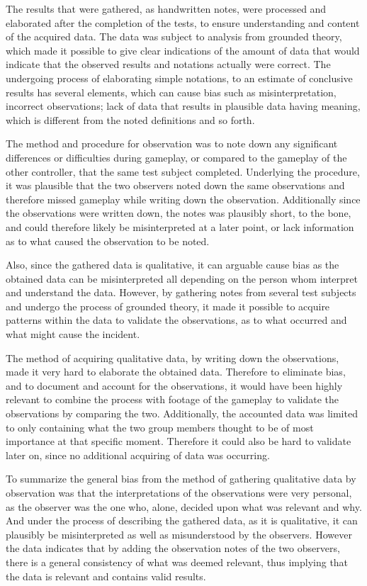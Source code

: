 The results that were gathered, as handwritten notes, were processed and elaborated after the completion of the tests, to ensure understanding and content of the acquired data. 
The data was subject to analysis from grounded theory, which made it possible to give clear indications of the amount of data that would indicate that the observed results and notations actually were correct. 
The undergoing process of elaborating simple notations, to an estimate of conclusive results has several elements, which can cause bias such as misinterpretation, incorrect observations; lack of data that results in plausible data having meaning, which is different from the noted definitions and so forth. 
\bigskip

The method and procedure for observation was to note down any significant differences or difficulties during gameplay, or compared to the gameplay of the other controller, that the same test subject completed. 
Underlying the procedure, it was plausible that the two observers noted down the same observations and therefore missed gameplay while writing down the observation. 
Additionally since the observations were written down, the notes was plausibly short, to the bone, and could therefore likely be misinterpreted at a later point, or lack information as to what caused the observation to be noted.
\bigskip

Also, since the gathered data is qualitative, it can arguable cause bias as the obtained data can be misinterpreted all depending on the person whom interpret and understand the data.
However, by gathering notes from several test subjects and undergo the process of grounded theory, it made it possible to acquire patterns within the data to validate the observations, as to what occurred and what might cause the incident. 
\bigskip

The method of acquiring qualitative data, by writing down the observations, made it very hard to elaborate the obtained data.
Therefore to eliminate bias, and to document and account for the observations, it would have been highly relevant to combine the process with footage of the gameplay to validate the observations by comparing the two. 
Additionally, the accounted data was limited to only containing what the two group members thought to be of most importance at that specific moment. 
Therefore it could also be hard to validate later on, since no additional acquiring of data was occurring. 
\bigskip

To summarize the general bias from the method of gathering qualitative data by observation was that the interpretations of the observations were very personal, as the observer was the one who, alone, decided upon what was relevant and why. 
And under the process of describing the gathered data, as it is qualitative, it can plausibly be misinterpreted as well as misunderstood by the observers. 
However the data indicates that by adding the observation notes of the two observers, there is a general consistency of what was deemed relevant, thus implying that the data is relevant and contains valid results.


